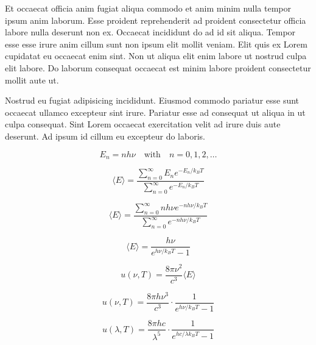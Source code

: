 Et occaecat officia anim fugiat aliqua commodo et anim minim nulla tempor ipsum anim laborum. Esse proident reprehenderit ad proident consectetur officia labore nulla deserunt non ex. Occaecat incididunt do ad id sit aliqua. Tempor esse esse irure anim cillum sunt non ipsum elit mollit veniam. Elit quis ex Lorem cupidatat eu occaecat enim sint. Non ut aliqua elit enim labore ut nostrud culpa elit labore. Do laborum consequat occaecat est minim labore proident consectetur mollit aute ut.

Nostrud eu fugiat adipisicing incididunt. Eiusmod commodo pariatur esse sunt occaecat ullamco excepteur sint irure. Pariatur esse ad consequat ut aliqua in ut culpa consequat. Sint Lorem occaecat exercitation velit ad irure duis aute deserunt. Ad ipsum id cillum eu excepteur do laboris.


\[
E_n = n h \nu \quad \text{with} \quad n = 0, 1, 2, \dots
\]

\[
\langle E \rangle = \frac{\sum_{n=0}^{\infty} E_n e^{-E_n / k_B T}}{\sum_{n=0}^{\infty} e^{-E_n / k_B T}}
\]

\[
\langle E \rangle = \frac{\sum_{n=0}^{\infty} n h \nu e^{-n h \nu / k_B T}}{\sum_{n=0}^{\infty} e^{-n h \nu / k_B T}}
\]

\[
\langle E \rangle = \frac{h \nu}{e^{h \nu / k_B T} - 1}
\]

\[
u(\nu, T) = \frac{8 \pi \nu^2}{c^3} \langle E \rangle
\]

\[
u(\nu, T) = \frac{8 \pi h \nu^3}{c^3} \cdot \frac{1}{e^{h \nu / k_B T} - 1}
\]

\[
u(\lambda, T) = \frac{8 \pi h c}{\lambda^5} \cdot \frac{1}{e^{h c / \lambda k_B T} - 1}
\]

